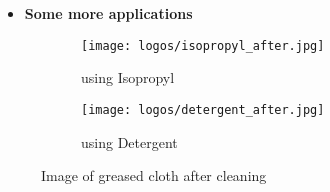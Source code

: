 \documentclass[table,french,english]{rapportCS}
\begin{document}
\begin{itemize}[label=$\bullet$]
    \item \textbf{Some more applications} 
\end{itemize}
\begin{figure}[h]
    \centering
    \begin{subfigure}{0.37\textwidth}
        \centering
        \texttt{[image: logos/isopropyl\_after.jpg]}
        \caption{using Isopropyl}
    \end{subfigure}\hspace{0.1\textwidth}%
    \begin{subfigure}{0.37\textwidth}
        \centering
        \texttt{[image: logos/detergent\_after.jpg]}
        \caption{using Detergent }
    \end{subfigure}
    \caption{Image of greased cloth after cleaning}
\end{figure}
\newpage
\end{document}
